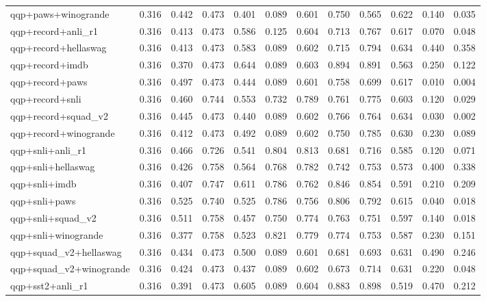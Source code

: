 \begin{table}[t]
\begin{tabular}{lrrrrrrrrrrr}
    qqp+paws+winogrande & 0.316 & 0.442 & 0.473 & 0.401 & 0.089 & 0.601 & 0.750 & 0.565 & 0.622 & 0.140 & 0.035 \\
    qqp+record+anli\_r1 & 0.316 & 0.413 & 0.473 & 0.586 & 0.125 & 0.604 & 0.713 & 0.767 & 0.617 & 0.070 & 0.048 \\
    qqp+record+hellaswag & 0.316 & 0.413 & 0.473 & 0.583 & 0.089 & 0.602 & 0.715 & 0.794 & 0.634 & 0.440 & 0.358 \\
    qqp+record+imdb & 0.316 & 0.370 & 0.473 & 0.644 & 0.089 & 0.603 & 0.894 & 0.891 & 0.563 & 0.250 & 0.122 \\
    qqp+record+paws & 0.316 & 0.497 & 0.473 & 0.444 & 0.089 & 0.601 & 0.758 & 0.699 & 0.617 & 0.010 & 0.004 \\
    qqp+record+snli & 0.316 & 0.460 & 0.744 & 0.553 & 0.732 & 0.789 & 0.761 & 0.775 & 0.603 & 0.120 & 0.029 \\
    qqp+record+squad\_v2 & 0.316 & 0.445 & 0.473 & 0.440 & 0.089 & 0.602 & 0.766 & 0.764 & 0.634 & 0.030 & 0.002 \\
    qqp+record+winogrande & 0.316 & 0.412 & 0.473 & 0.492 & 0.089 & 0.602 & 0.750 & 0.785 & 0.630 & 0.230 & 0.089 \\
    qqp+snli+anli\_r1 & 0.316 & 0.466 & 0.726 & 0.541 & 0.804 & 0.813 & 0.681 & 0.716 & 0.585 & 0.120 & 0.071 \\
    qqp+snli+hellaswag & 0.316 & 0.426 & 0.758 & 0.564 & 0.768 & 0.782 & 0.742 & 0.753 & 0.573 & 0.400 & 0.338 \\
    qqp+snli+imdb & 0.316 & 0.407 & 0.747 & 0.611 & 0.786 & 0.762 & 0.846 & 0.854 & 0.591 & 0.210 & 0.209 \\
    qqp+snli+paws & 0.316 & 0.525 & 0.740 & 0.525 & 0.786 & 0.756 & 0.806 & 0.792 & 0.615 & 0.040 & 0.018 \\
    qqp+snli+squad\_v2 & 0.316 & 0.511 & 0.758 & 0.457 & 0.750 & 0.774 & 0.763 & 0.751 & 0.597 & 0.140 & 0.018 \\
    qqp+snli+winogrande & 0.316 & 0.377 & 0.758 & 0.523 & 0.821 & 0.779 & 0.774 & 0.753 & 0.587 & 0.230 & 0.151 \\
    qqp+squad\_v2+hellaswag & 0.316 & 0.434 & 0.473 & 0.500 & 0.089 & 0.601 & 0.681 & 0.693 & 0.631 & 0.490 & 0.246 \\
    qqp+squad\_v2+winogrande & 0.316 & 0.424 & 0.473 & 0.437 & 0.089 & 0.602 & 0.673 & 0.714 & 0.631 & 0.220 & 0.048 \\
    qqp+sst2+anli\_r1 & 0.316 & 0.391 & 0.473 & 0.605 & 0.089 & 0.604 & 0.883 & 0.898 & 0.519 & 0.470 & 0.212 \\

\end{tabular}
\end{table}
